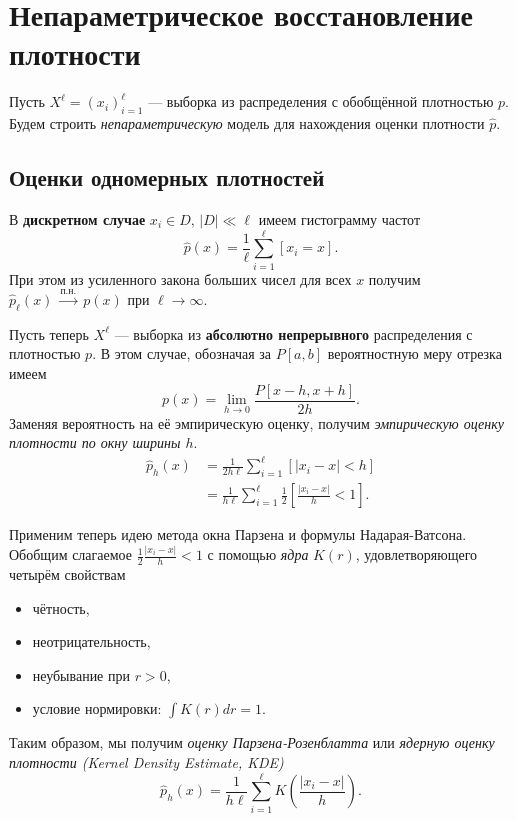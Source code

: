 {
\def\R{\mathbb{R}}
\def\E{\mathbb{E}}
\def\asto{\xrightarrow{\text{п.н.}}
}

\section{Непараметрическое восстановление плотности}

Пусть $ X^\ell = (x_i)_{i = 1}^\ell $ --- выборка из распределения с обобщённой
плотностью $p$. Будем строить \emph{непараметрическую} модель для нахождения оценки
плотности $\hat{p}$.

\subsection*{Оценки одномерных плотностей}
В \textbf{дискретном случае} $x_i \in D,\,|D| \ll \ell$ имеем гистограмму частот
\begin{equation*}
\hat{p}(x) = \frac{1}{\ell}\sum_{i = 1}^\ell [x_i = x].
\end{equation*} 
При этом из усиленного закона больших чисел для всех $x$ получим
$ \hat{p}_\ell(x)~\asto~p(x) $ при $ \ell \to \infty $.

Пусть теперь $X^\ell$ --- выборка из \textbf{абсолютно непрерывного}
распределения с плотностью $p$. В этом случае, обозначая за $P[a,b]$
вероятностную меру отрезка имеем
\begin{equation*}
p(x) = \lim_{h \to 0}\frac{P[x - h, x + h]}{2h}.
\end{equation*}
Заменяя вероятность на её эмпирическую оценку, получим
\emph{эмпирическую оценку плотности по окну ширины $h$}.
\begin{align*}
\hat{p}_h(x)
  &= \frac{1}{2h\ell}\sum_{i = 1}^\ell [|x_i - x| < h]\\
  &= \frac{1}{h\ell}\sum_{i = 1}^\ell \frac{1}{2}\left[\frac{|x_i - x|}{h} < 1\right].
\end{align*}

Применим теперь идею метода окна Парзена и формулы Надарая-Ватсона. Обобщим
слагаемое $ \frac{1}{2}\frac{|x_i - x|}{h} < 1 $ с помощью \emph{ядра} $K(r)$,
удовлетворяющего четырём свойствам
\begin{itemize}
\item чётность,
\item неотрицательность,
\item неубывание при $r > 0$,
\item условие нормировки: $ \int K(r) dr = 1$.
\end{itemize}
Таким образом, мы получим \emph{оценку Парзена-Розенблатта} или
\emph{ядерную оценку плотности (Kernel Density Estimate, KDE)}
\begin{equation*}
\hat{p}_h(x)
  = \frac{1}{h\ell}\sum_{i = 1}^\ell K\left(\frac{|x_i - x|}{h}\right).
\end{equation*}

}

